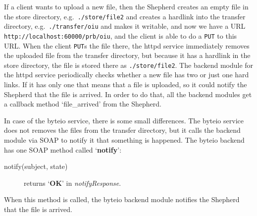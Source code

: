 \documentclass{book}
\begin{document}
If a client wants to upload a new file, then the Shepherd creates an empty file in the store directory, e.g.~\verb!./store/file2! and creates a hardlink into the transfer directory, e.g.~\verb!./transfer/oiu! and makes it writable, and now we have a URL \verb!http://localhost:60000/prb/oiu!, and the client is able to do a \verb!PUT! to this URL. When the client \verb!PUT!s the file there, the httpd service immediately removes the uploaded file from the transfer directory, but because it has a hardlink in the store directory, the file is stored there as \verb!./store/file2!. The backend module for the httpd service periodically checks whether a new file has two or just one hard links. If it has only one that means that a file is uploaded, so it could notify the Shepherd that the file is arrived. In order to do that, all the backend modules get a callback method `file\_arrived' from the Shepherd.

In case of the byteio service, there is some small differences. The byteio service does not removes the files from the transfer directory, but it calls the backend module via SOAP to notify it that something is happened. The byteio backend has one SOAP method called `\textbf{notify}':
\begin{description}
    \item[notify(subject, state)] returns `\textbf{OK}' in \emph{notifyResponse}.
\end{description}
When this method is called, the byteio backend module notifies the Shepherd that the file is arrived.
\end{document}
